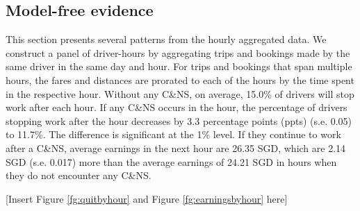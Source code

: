 \documentclass[reviewmode,AEJ]{AEA}
\begin{document}
\subsection{Model-free evidence}
This section presents several patterns from the hourly aggregated data. We construct a panel of driver-hours by aggregating trips and bookings made by the same driver in the same day and hour. For trips and bookings that span multiple hours, the fares and distances are prorated to each of the hours by the time spent in the respective hour. 
Without any C\&NS, on average, 15.0\% of drivers will stop work after each hour.
If any C\&NS occurs in the hour, the percentage of drivers stopping work after the hour decreases by 3.3
percentage points (ppts) (s.e. 0.05) to 11.7\%. The difference is significant at the 1\% level. 
If they continue to work after a C\&NS, average earnings in the next hour are 26.35 SGD, which are 2.14 SGD
(s.e. 0.017) more than the average earnings of 24.21 SGD in hours when they do not encounter any C\&NS. 


\begin{center}
	[Insert Figure \ref{fg:quitbyhour} and Figure \ref{fg:earningsbyhour} here]
\end{center}
\end{document}
